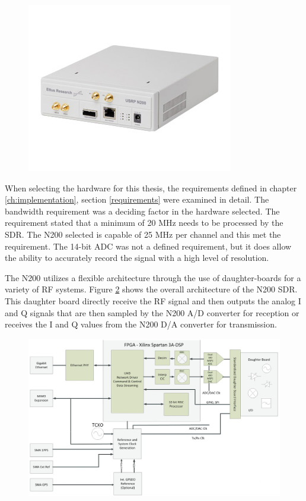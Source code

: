 {\begin{figure}[h!tb] 
\centering
\includegraphics{Images/n200}
\label{N200}
\end{figure}
}

When selecting the hardware for this thesis, the requirements defined in chapter \ref{ch:implementation}, section \ref{requirements} were examined in detail.  The bandwidth requirement was a deciding factor in the hardware selected.  The requirement stated that a minimum of 20 MHz needs to be processed by the SDR.  The N200 selected is capable of 25 MHz per channel and this met the requirement.  The 14-bit ADC was not a defined requirement, but it does allow the ability to accurately record the signal with a high level of resolution.  

The N200 utilizes a flexible architecture through the use of daughter-boards for a variety of RF systems.  Figure \ref{N200_block} shows the overall architecture of the N200 SDR.  This daughter board directly receive the RF signal and then outputs the analog I and Q signals that are then sampled by the N200 A/D converter for reception or receives the I and Q values from the N200 D/A converter for transmission. 

{\begin{figure}[h!tb] 
\centering
\includegraphics[width=14cm]{Images/n200_block_edited}
\label{N200_block}
\end{figure}
}

